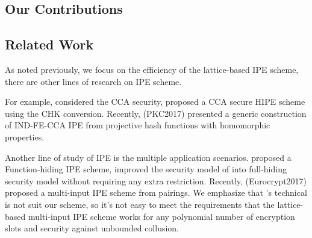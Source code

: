 \subsection{Our Contributions}





















\subsection{Related Work}
As noted previously, we focus on the efficiency of the lattice-based IPE scheme, there are other lines of research on IPE scheme.\

For example, considered the CCA security, \cite{LC:AbdDeCMoc12} proposed a CCA secure HIPE scheme using the CHK conversion\cite{Boneh2007Chosen}. Recently, \cite{cryptoeprint:2017:038}(PKC2017) presented a generic construction of IND-FE-CCA IPE from projective hash functions with homomorphic properties.\

Another line of study of IPE is the multiple application scenarios. \cite{AC:BisJaiKow15} proposed a Function-hiding IPE scheme, \cite{PKC:DatDutMuk16} improved the security model of \cite{AC:BisJaiKow15} into full-hiding security model without requiring any extra restriction. Recently, \cite{cryptoeprint:2016:425}(Eurocrypt2017) proposed a multi-input IPE scheme from pairings. We emphasize that \cite{cryptoeprint:2016:425}'s technical is not suit our scheme, so it's not easy to meet the requirements that the lattice-based multi-input IPE scheme works for any polynomial number of encryption slots and security against unbounded collusion.





